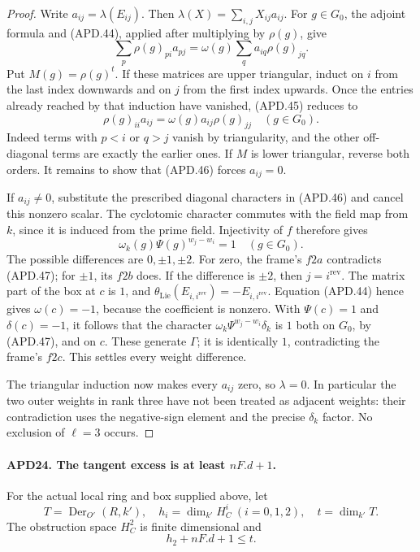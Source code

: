 \begin{proof}
Write \(a_{ij}=\lambda(E_{ij})\).  Then
\(\lambda(X)=\sum_{i,j}X_{ij}a_{ij}\).  For \(g\in G_0\),
the adjoint formula and (APD.44), applied after multiplying by
\(\rho(g)\), give
\[
 \sum_p\rho(g)_{pi}a_{pj}
                  =\omega(g)\sum_q a_{iq}\rho(g)_{jq}.
                                                               \tag{APD.45}
\]
Put \(M(g)=\rho(g)^t\).  If these matrices are upper
triangular, induct on \(i\) from the last index downwards
and on \(j\) from the first index upwards.  Once the entries
already reached by that induction have vanished, (APD.45)
reduces to
\[
       \rho(g)_{ii}a_{ij}
                         =\omega(g)a_{ij}\rho(g)_{jj}
                                  \quad(g\in G_0).       \tag{APD.46}
\]
Indeed terms with \(p<i\) or \(q>j\) vanish by triangularity,
and the other off-diagonal terms are exactly the earlier ones.
If \(M\) is lower triangular, reverse both orders.  It remains
to show that (APD.46) forces \(a_{ij}=0\).

If \(a_{ij}\ne0\), substitute the prescribed diagonal
characters in (APD.46) and cancel this nonzero scalar.  The
cyclotomic character commutes with the field map from \(k\),
since it is induced from the prime field.  Injectivity of \(f\)
therefore gives
\[
          \omega_k(g)\Psi(g)^{w_j-w_i}=1
                                  \quad(g\in G_0).       \tag{APD.47}
\]
The possible differences are \(0,\pm1,\pm2\).  For zero,
the frame's \(f2a\) contradicts (APD.47); for \(\pm1\),
its \(f2b\) does.  If the difference is \(\pm2\), then
\(j=i^{\mathrm{rev}}\).  The matrix part of the box at
\(c\) is \(1\), and
\(\theta_{\mathrm{Lie}}(E_{i,i^{\mathrm{rev}}})
             =-E_{i,i^{\mathrm{rev}}}\).
Equation (APD.44) hence gives \(\omega(c)=-1\), because
the coefficient is nonzero.  With \(\Psi(c)=1\) and
\(\delta(c)=-1\), it follows that the character
\(\omega_k\Psi^{w_j-w_i}\delta_k\) is \(1\) both on
\(G_0\), by (APD.47), and on \(c\).  These generate
\(\Gamma\); it is identically \(1\), contradicting the
frame's \(f2c\).  This settles every weight difference.

The triangular induction now makes every \(a_{ij}\) zero,
so \(\lambda=0\).  In particular the two outer weights in
rank three have not been treated as adjacent weights: their
contradiction uses the negative-sign element and the precise
\(\delta_k\) factor.  No exclusion of \(\ell=3\) occurs.
\end{proof}

\paragraph{APD24. The tangent excess is at least \(nF.d+1\).}
\label{claim:APD24}
For the actual local ring and box supplied above, let
\[
 T=\operatorname{Der}_{O'}(R,k'),\quad
 h_i=\dim_{k'}H_C^i\ (i=0,1,2),\quad t=\dim_{k'}T.
\]
The obstruction space \(H_C^2\) is finite dimensional and
\[
                         h_2+nF.d+1\le t.                \tag{APD.48}
\]

